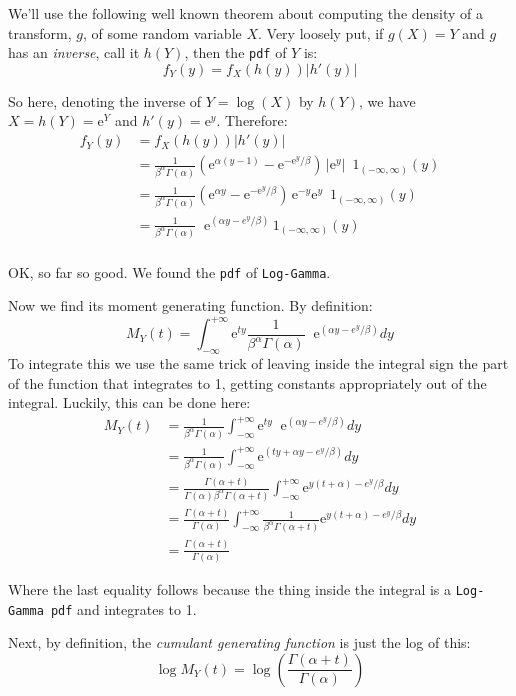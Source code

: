 \documentclass[12pt]{article}
\begin{document}
We'll use the following well known theorem about computing the density of a transform, $g$, of some random variable $X$. Very loosely put, if $g(X) = Y$ and $g$ has an \emph{inverse}, call it $h(Y)$, then the \texttt{pdf} of $Y$ is:
$$
f_Y(y) = f_X(h(y)) |h'(y)|
$$

So here, denoting the inverse of $Y = \log (X)$ by $h(Y)$, we have $ X=h(Y)=\mathrm{e}^Y$ and $h'(y) = \mathrm{e}^{y}$. Therefore:
\begin{align*}
 f_Y(y) &= f_X(h(y)) |h'(y)| \\
 &= \frac{1}{\beta^\alpha \Gamma(\alpha)} \left(\mathrm{e}^{\alpha (y - 1)} - \mathrm{e}^{-\mathrm{e}^y/\beta}\right)\,|\mathrm{e}^{y}| \,\,\,1_{(-\infty,\infty)}(y) \\
  &= \frac{1}{\beta^\alpha \Gamma(\alpha)} \left(\mathrm{e}^{\alpha y} - \mathrm{e}^{-\mathrm{e}^y/\beta}\right)\,\mathrm{e}^{-y}\mathrm{e}^{y} \,\,\,1_{(-\infty,\infty)}(y) \\
 &= \frac{1}{\beta^\alpha \Gamma(\alpha)} \;\; \mathrm{e}^{\left(\alpha y - e^y/\beta\right)}\,1_{(-\infty,\infty)}(y) \\
\end{align*}

OK, so far so good. We found the \texttt{pdf} of \texttt{Log-Gamma}. 

Now we find its moment generating function. By definition:
$$
M_Y(t) = \int_{-\infty}^{+\infty} \mathrm{e}^{ty} \frac{1}{\beta^\alpha \Gamma(\alpha)} \;\; \mathrm{e}^{\left(\alpha y - e^y/\beta\right)} dy
$$
To integrate this we use the same trick of leaving inside the integral sign the part of the function that integrates to 1, getting constants appropriately out of the integral. Luckily, this can be done here:
\begin{align*}
M_Y(t) &= \frac{1}{\beta^\alpha \Gamma(\alpha)} \int_{-\infty}^{+\infty} \mathrm{e}^{ty} \;\; \mathrm{e}^{\left(\alpha y - e^y/\beta\right)} dy\\
&= \frac{1}{\beta^\alpha \Gamma(\alpha)} \int_{-\infty}^{+\infty} \mathrm{e}^{\left(ty +\alpha y - e^y/\beta\right)} dy\\
&= \frac{\Gamma(\alpha + t)}{\Gamma(\alpha) \beta^\alpha \Gamma(\alpha + t)} \int_{-\infty}^{+\infty} \mathrm{e}^{y \left(t +\alpha \right) - e^y/\beta} dy\\
&= \frac{\Gamma(\alpha + t)}{\Gamma(\alpha)}  \int_{-\infty}^{+\infty} \frac{1} {\beta^\alpha \Gamma(\alpha + t)}\mathrm{e}^{y \left(t +\alpha \right) - e^y/\beta} dy\\
&= \frac{\Gamma(\alpha + t)}{\Gamma(\alpha)} 
\end{align*}

Where the last equality follows because the thing inside the integral is a \texttt{Log-Gamma pdf} and integrates to 1.

Next, by definition, the \emph{cumulant generating function} is just the log of this:
$$
\log M_Y(t) = \log \left(\frac{\Gamma(\alpha + t)}{\Gamma(\alpha)} \right)
$$



 
\end{document}
